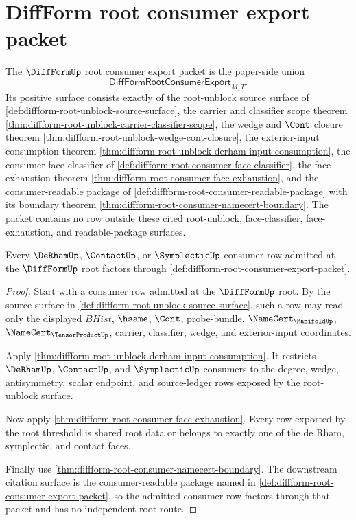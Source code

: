 \section{DiffForm root consumer export packet}
\label{sec:diffform-root-consumer-export-packet}

\begin{definition}
\label{def:diffform-root-consumer-export-packet}
The $\DiffFormUp$ root consumer export packet is the paper-side union
$$
\mathsf{DiffFormRootConsumerExport}_{M,T}.
$$
Its positive surface consists exactly of the root-unblock source surface of
\autoref{def:diffform-root-unblock-source-surface}, the carrier and
classifier scope theorem
\autoref{thm:diffform-root-unblock-carrier-classifier-scope}, the wedge and
$\Cont$ closure theorem
\autoref{thm:diffform-root-unblock-wedge-cont-closure}, the exterior-input
consumption theorem
\autoref{thm:diffform-root-unblock-derham-input-consumption}, the consumer
face classifier of \autoref{def:diffform-root-consumer-face-classifier}, the
face exhaustion theorem
\autoref{thm:diffform-root-consumer-face-exhaustion}, and the
consumer-readable package of
\autoref{def:diffform-root-consumer-readable-package} with its boundary
theorem \autoref{thm:diffform-root-consumer-namecert-boundary}. The packet
contains no row outside these cited root-unblock, face-classifier,
face-exhaustion, and readable-package surfaces.
\end{definition}

\begin{theorem}
\label{thm:diffform-root-consumer-export-coverage}
Every $\DeRhamUp$, $\ContactUp$, or $\SymplecticUp$ consumer row admitted at
the $\DiffFormUp$ root factors through
\autoref{def:diffform-root-consumer-export-packet}.
\end{theorem}
\begin{proof}
Start with a consumer row admitted at the $\DiffFormUp$ root. By the source
surface in \autoref{def:diffform-root-unblock-source-surface}, such a row may
read only the displayed $BHist$, $\hsame$, $\Cont$, probe-bundle,
$\NameCert_{\ManifoldUp}$, $\NameCert_{\TensorProductUp}$, carrier,
classifier, wedge, and exterior-input coordinates.

Apply \autoref{thm:diffform-root-unblock-derham-input-consumption}. It
restricts $\DeRhamUp$, $\ContactUp$, and $\SymplecticUp$ consumers to the
degree, wedge, antisymmetry, scalar endpoint, and source-ledger rows exposed
by the root-unblock surface.

Now apply \autoref{thm:diffform-root-consumer-face-exhaustion}. Every row
exported by the root threshold is shared root data or belongs to exactly one
of the de Rham, symplectic, and contact faces.

Finally use
\autoref{thm:diffform-root-consumer-namecert-boundary}. The downstream
citation surface is the consumer-readable package named in
\autoref{def:diffform-root-consumer-export-packet}, so the admitted consumer
row factors through that packet and has no independent root route.
\end{proof}

